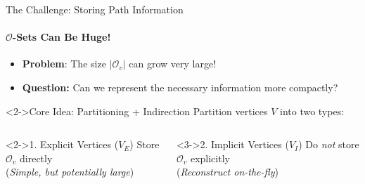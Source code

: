 \begin{frame}{The Challenge: Storing Path Information}
    \framesubtitle{$\mathcal{O}$-Sets Can Be Huge!}

    \begin{itemize}
        \item \textbf{Problem}: The size $|\mathcal{O}_v|$ can grow very large!
        \item \textbf{Question:} Can we represent the necessary information more compactly?
    \end{itemize}


    \begin{alertblock}<2->{Core Idea: Partitioning + Indirection}
        Partition vertices $V$ into two types:
    \end{alertblock}
    \vspace{-1em}
    \begin{columns}[T] %
        \begin{column}{0.48\textwidth}
            \begin{block}<2->{1. Explicit Vertices ($V_E$)}
                \centering
                Store $\mathcal{O}_v$ directly \\
                (\textit{Simple, but potentially large})
            \end{block}
        \end{column}

        \begin{column}{0.48\textwidth}
            \begin{block}<3->{2. Implicit Vertices ($V_I$)}
                \centering
                Do \emph{not} store $\mathcal{O}_v$ explicitly \\
                (\textit{Reconstruct on-the-fly})
            \end{block}
            \vspace{0.5em}
        \end{column}
    \end{columns}
\end{frame}

